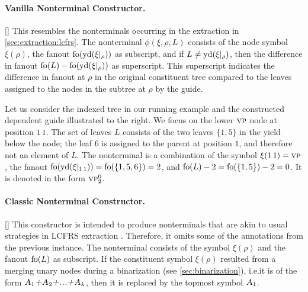 \documentclass[../../document.tex]{subfiles}
\begin{document}
    \paragraph{Vanilla Nonterminal Constructor.}[]
    This resembles the nonterminals occurring in the extraction in \cref{sec:extraction:lcfrs}.
    The nonterminal \(\phi(\xi, \rho, L)\) consists of the node symbol \(\xi(\rho)\), the fanout \(\operatorname{fo}(\operatorname{yd}(\xi|_\rho))\) as subscript, and if \(L \neq \operatorname{yd}(\xi|_\rho)\), then the difference in fanout \(\operatorname{fo}(L) - \operatorname{fo}(\operatorname{yd}(\xi|_\rho))\) as superscript.
    This superscript indicates the difference in fanout at \(\rho\) in the original constituent tree compared to the leaves assigned to the nodes in the subtree at \(\rho\) by the guide.

    \begin{wrapfigure}[6]{r}{0pt}
        
    \end{wrapfigure}
    Let us consider the indexed tree in our running example and the constructed dependent guide illustrated to the right.
    We focus on the lower \(\textsc{vp}\) node at position \(1\,1\).
    The set of leaves \(L\) consists of the two leaves \(\{1,5\}\) in the yield below the node; the leaf \(6\) is assigned to the parent at position \(1\), and therefore not an element of \(L\).
    The nonterminal is a combination of the symbol \(\xi(1\,1) = \textsc{vp}\), the fanout \(\operatorname{fo}(\operatorname{yd}(\xi|_{1\,1})) = \operatorname{fo}(\{1,5,6\}) = 2\), and \(\operatorname{fo}(L) - 2 = \operatorname{fo}(\{1,5\})-2=0\).
    It is denoted in the form \(\textsc{vp}^0_2\).

    \paragraph{Classic Nonterminal Constructor.}[]
    This constructor is intended to produce nonterminals that are akin to usual strategies in LCFRS extraction \cite{MaierSogaard08}.
    Therefore, it omits some of the annotations from the previous instance.
    The nonterminal consists of the symbol \(\xi(\rho)\) and the fanout \(\operatorname{fo}(L)\) as subscript.
    If the constituent symbol \(\xi(\rho)\) resulted from a merging unary nodes during a binarization (see \cref{sec:binarization}), i.e.\@ it is of the form \(\textsc{\textsl{A$_1$+A$_2$+...+A$_k$}}\), then it is replaced by the topmost symbol \(\textsc{\textsl{A}}_1\).
\end{document}
